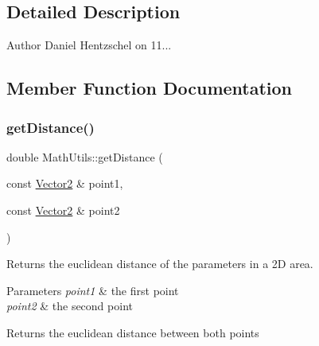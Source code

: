 \subsection{Detailed Description}
\begin{DoxyAuthor}{Author}
Daniel Hentzschel on 11... 
\end{DoxyAuthor}


\subsection{Member Function Documentation}
\mbox{\label{class_math_utils_a6d93f11c60b52d16fc2e86cf8e53ab32}} 
\subsubsection{\texorpdfstring{getDistance()}{getDistance()}\hspace{0.1cm}{\footnotesize\ttfamily [1/4]}}
{\footnotesize\ttfamily double Math\+Utils\+::get\+Distance (\begin{DoxyParamCaption}\item[{const \mbox{\hyperlink{struct_vector2}{Vector2}} \&}]{point1,  }\item[{const \mbox{\hyperlink{struct_vector2}{Vector2}} \&}]{point2 }\end{DoxyParamCaption})\hspace{0.3cm}{\ttfamily [static]}}



Returns the euclidean distance of the parameters in a 2D area. 


\begin{DoxyParams}{Parameters}
{\em point1} & the first point \\
\hline
{\em point2} & the second point \\
\hline
\end{DoxyParams}
\begin{DoxyReturn}{Returns}
the euclidean distance between both points 
\end{DoxyReturn}
\mbox{\label{class_math_utils_a7ed65746290db63515b946f9e20c0c47}} 
